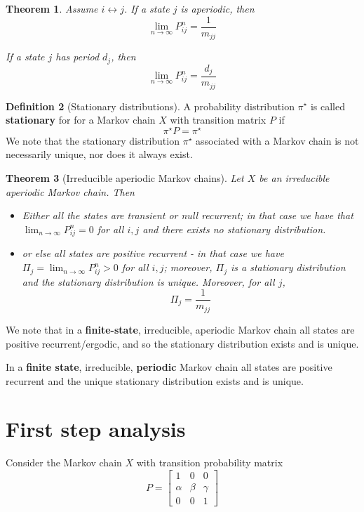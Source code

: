\documentclass[10pt, oneside, reqno]{amsart}
\theoremstyle{plain}%
\newtheorem{thm}{Theorem}[section]
\theoremstyle{definition}
\newtheorem{defn}[thm]{Definition}
\theoremstyle{remark}
\begin{document}
\begin{thm}
    Assume $i \leftrightarrow j$. If a state $j$ is aperiodic, then \[
        \lim_{n \rightarrow \infty} P^n_{ij} = \frac{1}{m_{jj}}
    \]
    
    If a state $j$ has period $d_j$, then \[
            \lim_{n \rightarrow \infty} P^n_{ij} = \frac{d_j}{m_{jj}}
    \]
\end{thm}


\begin{defn}[Stationary distributions]
    A probability distribution $\pi^\star$ is called \textbf{stationary} for for a Markov chain $X$ with transition matrix $P$ if \[
        \pi^\star P = \pi^\star
    \]
We note that the stationary distribution $\pi^\star$ associated with a Markov chain is not necessarily unique, nor does it always exist.
\end{defn}

\begin{thm}[Irreducible aperiodic Markov chains]
        Let $X$ be an irreducible aperiodic Markov chain.  Then
        \begin{itemize}
            \item Either all the states are transient or null recurrent; in that case we have that $\lim_{n \rightarrow \infty} P^n_{ij} = 0$ for all $i,j$ and there exists no stationary distribution.
            \item or else all states are positive recurrent - in that case we have $\Pi_j = \lim_{n \rightarrow \infty} P^n_{ij} > 0$ for all $i,j$; moreover, $\Pi_j$ is a stationary distribution and the stationary distribution is unique.  Moreover, for all $j$, \[
                \Pi_j = \frac{1}{m_{jj}}
            \]
        \end{itemize}
        
\end{thm}
    We note that in a \textbf{finite-state}, irreducible, aperiodic Markov chain all states are positive recurrent/ergodic, and so the stationary distribution exists and is unique.

In a \textbf{finite state}, irreducible, \textbf{periodic} Markov chain all states are positive recurrent and the unique stationary distribution exists and is unique.




\section{First step analysis} %
\label{sub:first_step_analysis}
Consider the Markov chain $X$ with transition probability matrix 
\[
    P = \begin{bmatrix}
            1 & 0 & 0 \\
            \alpha & \beta & \gamma \\
            0 & 0 & 1
    \end{bmatrix}   
\]
\end{document}
